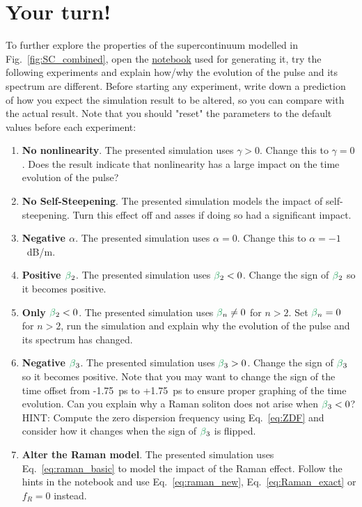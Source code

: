 \section{Your turn!}
To further explore the properties of the supercontinuum modelled in Fig.~\ref{fig:SC_combined}, open the \href{https://colab.research.google.com/drive/1HvA8F8yzEq-9fahuI4z2KhT-YhdRAXgt?usp=sharing}{notebook} used for generating it, try the following experiments and explain how/why the evolution of the pulse and its spectrum are different. Before starting any experiment, write down a prediction of how you expect the simulation result to be altered, so you can compare with the actual result. Note that you should "reset" the parameters to the default values before each experiment:

\begin{enumerate}

\item \textbf{No nonlinearity}. The presented simulation uses $\gamma>0$. Change this to $\gamma=0$. Does the result indicate that nonlinearity has a large impact on the time evolution of the pulse?

\item \textbf{No Self-Steepening}. The presented simulation models the impact of self-steepening. Turn this effect off and asses if doing so had a significant impact.

\item \textbf{Negative $\alpha$}. The presented simulation uses $\alpha=0$. Change this to $\alpha=-1$~dB/m. 



\item \textbf{Positive $\betag_2$}. The presented simulation uses $\betag_2<0$. Change the sign of $\betag_2$ so it becomes positive. 



\item \textbf{Only $\betag_2<0$}. The presented simulation uses $\betag_n\neq0$ for $n>2$. Set $\betag_n = 0$ for $n>2$, run the simulation and explain why the evolution of the pulse and its spectrum has changed. 

\item \textbf{Negative $\betag_3$}. The presented simulation uses $\betag_3>0$. Change the sign of $\betag_3$ so it becomes positive. Note that you may want to change the sign of the time offset from -1.75~ps to +1.75~ps to ensure proper graphing of the time evolution. Can you explain why a Raman soliton does not arise when $\betag_3<0$? HINT: Compute the zero dispersion frequency using Eq.~\ref{eq:ZDF} and consider how it changes when the sign of $\betag_3$ is flipped.


\item \textbf{Alter the Raman model}. The presented simulation uses Eq.~\ref{eq:raman_basic} to model the impact of the Raman effect. Follow the hints in the notebook and use Eq.~\ref{eq:raman_new}, Eq.~\ref{eq:Raman_exact} or $f_R=0$ instead.  
\end{enumerate}